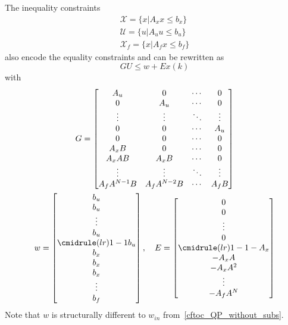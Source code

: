 The inequality constraints
\begin{gather*}
    \mathcal{X} = \{x|A_x x \leq b_x\} \\
    \mathcal{U} = \{u|A_u u \leq b_u\} \\
    \mathcal{X}_f = \{x|A_f x \leq b_f\}
\end{gather*}
also encode the equality constraints and can be rewritten as
\begin{equation*}
    GU\leq w + Ex(k)
\end{equation*}
with
\begin{gather*}
    G = \begin{bmatrix}
        A_u           & 0             & \cdots & 0      \\
        0             & A_u           & \cdots & 0      \\
        \vdots        & \vdots        & \ddots & \vdots \\
        0             & 0             & \cdots & A_u    \\
        0             & 0             & \cdots & 0      \\
        A_x B         & 0             & \cdots & 0      \\
        A_x AB        & A_x B         & \cdots & 0      \\
        \vdots        & \vdots        & \ddots & \vdots \\
        A_f A^{N-1} B & A_f A^{N-2} B & \cdots & A_f B
    \end{bmatrix}\\
    w = \begin{bmatrix}
        b_u                    \\
        b_u                    \\
        \vdots                 \\
        b_u                    \\
        \cmidrule(lr){1-1} b_u \\
        b_x                    \\
        b_x                    \\
        b_x                    \\
        \vdots                 \\
        b_f
    \end{bmatrix}, \quad
    E = \begin{bmatrix}
        0                       \\
        0                       \\
        \vdots                  \\
        0                       \\
        \cmidrule(lr){1-1} -A_x \\
        -A_x A                  \\
        -A_x A^2                \\
        \vdots                  \\
        -A_f A^N
    \end{bmatrix}
\end{gather*}
Note that $w$ is structurally different to $w_{in}$ from~\ref{cftoc_QP_without_subs}.

